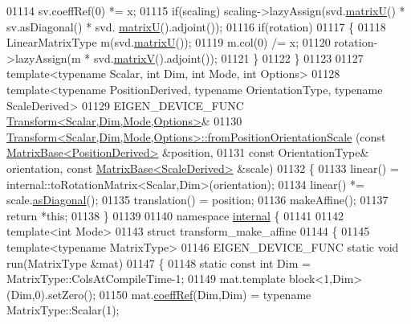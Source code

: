 \begin{DoxyCode}
01114   sv.coeffRef(0) *= x;
01115   \textcolor{keywordflow}{if}(scaling) scaling->lazyAssign(svd.\hyperlink{group___s_v_d___module_afc7fe1546b0f6e1801b86f22f5664cb8}{matrixU}() * sv.asDiagonal() * svd.
      \hyperlink{group___s_v_d___module_afc7fe1546b0f6e1801b86f22f5664cb8}{matrixU}().adjoint());
01116   \textcolor{keywordflow}{if}(rotation)
01117   \{
01118     LinearMatrixType m(svd.\hyperlink{group___s_v_d___module_afc7fe1546b0f6e1801b86f22f5664cb8}{matrixU}());
01119     m.col(0) /= x;
01120     rotation->lazyAssign(m * svd.\hyperlink{group___s_v_d___module_a245a453b5e7347f737295c23133238c4}{matrixV}().adjoint());
01121   \}
01122 \}
01123 
01127 \textcolor{keyword}{template}<\textcolor{keyword}{typename} Scalar, \textcolor{keywordtype}{int} Dim, \textcolor{keywordtype}{int} Mode, \textcolor{keywordtype}{int} Options>
01128 \textcolor{keyword}{template}<\textcolor{keyword}{typename} PositionDerived, \textcolor{keyword}{typename} OrientationType, \textcolor{keyword}{typename} ScaleDerived>
01129 EIGEN\_DEVICE\_FUNC \hyperlink{group___geometry___module_class_eigen_1_1_transform}{Transform<Scalar,Dim,Mode,Options>}&
01130 \hyperlink{group___geometry___module_class_eigen_1_1_transform}{Transform<Scalar,Dim,Mode,Options>::fromPositionOrientationScale}
      (\textcolor{keyword}{const} \hyperlink{group___core___module_class_eigen_1_1_matrix_base}{MatrixBase<PositionDerived>} &position,
01131   \textcolor{keyword}{const} OrientationType& orientation, \textcolor{keyword}{const} \hyperlink{group___core___module_class_eigen_1_1_matrix_base}{MatrixBase<ScaleDerived>} &scale)
01132 \{
01133   linear() = internal::toRotationMatrix<Scalar,Dim>(orientation);
01134   linear() *= scale.\hyperlink{group___core___module_a14235b62c90f93fe910070b4743782d0}{asDiagonal}();
01135   translation() = position;
01136   makeAffine();
01137   \textcolor{keywordflow}{return} *\textcolor{keyword}{this};
01138 \}
01139 
01140 \textcolor{keyword}{namespace }\hyperlink{namespaceinternal}{internal} \{
01141 
01142 \textcolor{keyword}{template}<\textcolor{keywordtype}{int} Mode>
01143 \textcolor{keyword}{struct }transform\_make\_affine
01144 \{
01145   \textcolor{keyword}{template}<\textcolor{keyword}{typename} MatrixType>
01146   EIGEN\_DEVICE\_FUNC \textcolor{keyword}{static} \textcolor{keywordtype}{void} run(MatrixType &mat)
01147   \{
01148     \textcolor{keyword}{static} \textcolor{keyword}{const} \textcolor{keywordtype}{int} Dim = MatrixType::ColsAtCompileTime-1;
01149     mat.template block<1,Dim>(Dim,0).setZero();
01150     mat.\hyperlink{class_eigen_1_1_plain_object_base_a25626a55b26a4323565f79d1b7c48ea8}{coeffRef}(Dim,Dim) = \textcolor{keyword}{typename} MatrixType::Scalar(1);

\end{DoxyCode}
